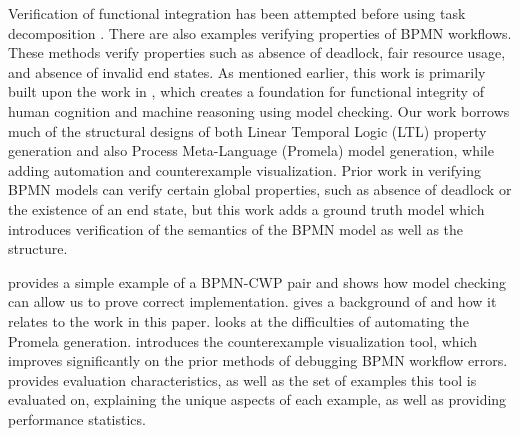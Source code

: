 Verification of functional integration has been attempted before using task decomposition \cite{decomposition}. There are also examples verifying properties of BPMN workflows.\cite{bpmnVerification1, bpmnVerification2, ASMverification} These methods verify properties such as absence of deadlock, fair resource usage, and absence of invalid end states.
As mentioned earlier, this work is primarily built upon the work in \cite{mercer22}, which creates a foundation for functional integrity of human cognition and machine reasoning using model checking. Our work borrows much of the structural designs of both Linear Temporal Logic (LTL)\cite{ltl} property generation and also Process Meta-Language (Promela)\cite{promelaManual} model generation, while adding automation and counterexample visualization.
Prior work in verifying BPMN models can verify certain global properties, such as absence of deadlock or the existence of an end state, but this work adds a ground truth model which introduces verification of the semantics of the BPMN model as well as the structure. 


 provides a simple example of a BPMN-CWP pair and shows how model checking can allow us to prove correct implementation.
 gives a background of \cite{mercer22} and how it relates to the work in this paper.
 looks at the difficulties of automating the Promela generation.
 introduces the counterexample visualization tool, which improves significantly on the prior methods of debugging BPMN workflow errors.
 provides evaluation characteristics, as well as the set of examples this tool is evaluated on, explaining the unique aspects of each example, as well as providing performance statistics.